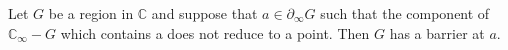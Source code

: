 Let $G$ be a region in $\mathbb{C}$ and suppose that $a \in \partial_\infty G$ such that the component of $\mathbb{C}_\infty - G$ which contains a does not reduce to a point. Then $G$ has a barrier at $a$.